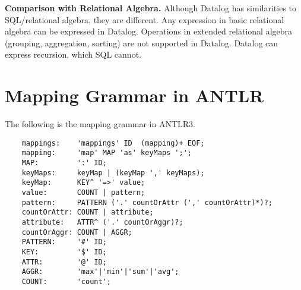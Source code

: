 \documentclass{acm_proc_article-sp}
\begin{document}
\textbf{Comparison with Relational Algebra.} Although Datalog has similarities to SQL/relational algebra, they are different. 
Any expression in basic relational algebra can be expressed in Datalog. Operations in extended relational algebra (grouping, aggregation, sorting) are not supported in Datalog. Datalog can express recursion, which SQL cannot.


%
%

%
%
%

\section{Mapping Grammar in ANTLR}
\label{grammar}

The following is the mapping grammar in ANTLR3. 
\begin{small}
	\begin{verbatim}
	mappings:    'mappings' ID  (mapping)+ EOF;
	mapping:     'map' MAP 'as' keyMaps ';';
	MAP:         ':' ID;
	keyMaps:     keyMap | (keyMap ',' keyMaps);
	keyMap:      KEY^ '=>' value;
	value:       COUNT | pattern;
	pattern:     PATTERN ('.' countOrAttr (',' countOrAttr)*)?;
	countOrAttr: COUNT | attribute;
	attribute:   ATTR^ ('.' countOrAggr)?;
	countOrAggr: COUNT | AGGR;
	PATTERN:     '#' ID;
	KEY:         '$' ID;
	ATTR:        '@' ID;
	AGGR:        'max'|'min'|'sum'|'avg';	
	COUNT:       'count';	
	\end{verbatim}
\end{small}
\end{document}
